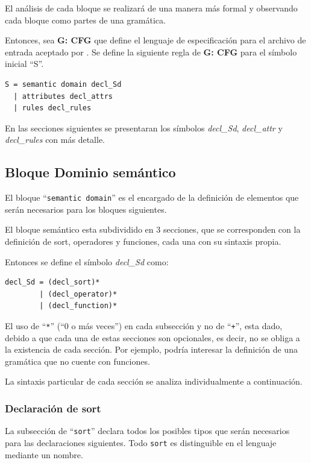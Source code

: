 El análisis de cada bloque se realizará de una manera más formal y observando cada bloque como partes de una gramática.

Entonces, sea \textbf{G: CFG} que define el lenguaje de especificación para el archivo de entrada aceptado por \maggen. Se define la siguiente regla de \textbf{G: CFG} para el símbolo inicial ``S''.

\begin{lstlisting}[frame=shadowbox, rulesepcolor=\color{azul},language=specmag, linewidth=10cm ]
S = semantic domain decl_Sd
  | attributes decl_attrs
  | rules decl_rules
\end{lstlisting}
\vspace{0.3cm}

En las secciones siguientes se presentaran los símbolos \textit{decl\_Sd}, \textit{decl\_attr} y \textit{decl\_rules} con más detalle.  

\subsection{Bloque Dominio semántico}

El bloque ``\texttt{semantic domain}'' es el encargado de la definición de elementos que serán necesarios para los bloques siguientes. 

El bloque semántico esta subdividido en 3 secciones, que se corresponden con la definición de sort, operadores y funciones, cada una con su sintaxis propia. 

Entonces se define el símbolo \textit{decl\_Sd} como:

\begin{lstlisting}[frame=shadowbox, rulesepcolor=\color{azul},language=inform,linewidth=10cm]
decl_Sd = (decl_sort)*
        | (decl_operator)*
        | (decl_function)*
\end{lstlisting}
\vspace{0.3cm}

El uso de ``\texttt{*}'' (``0 o más veces'') en cada subsección y no de ``\texttt{+}'', esta dado, debido a que cada una de estas secciones son opcionales, es decir, no se obliga a la existencia de cada sección. Por ejemplo, podría interesar la definición de una gramática que no cuente con funciones.

La sintaxis particular de cada sección se analiza individualmente a continuación.

\subsubsection{Declaración de sort}
La subsección de ``\texttt{sort}'' declara todos los posibles tipos que serán necesarios para las declaraciones siguientes. Todo \texttt{sort} es distinguible en el lenguaje mediante un nombre.

